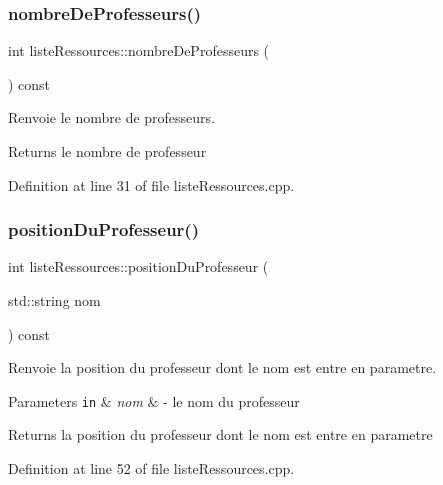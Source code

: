 \subsubsection{\texorpdfstring{nombre\+De\+Professeurs()}{nombreDeProfesseurs()}}
{\footnotesize\ttfamily int liste\+Ressources\+::nombre\+De\+Professeurs (\begin{DoxyParamCaption}{ }\end{DoxyParamCaption}) const}



Renvoie le nombre de professeurs. 

\begin{DoxyReturn}{Returns}
le nombre de professeur 
\end{DoxyReturn}


Definition at line 31 of file liste\+Ressources.\+cpp.

\hypertarget{classliste_ressources_a1ba16dd4280006301dc94d467b9dddaa}{}\label{classliste_ressources_a1ba16dd4280006301dc94d467b9dddaa} 
\subsubsection{\texorpdfstring{position\+Du\+Professeur()}{positionDuProfesseur()}}
{\footnotesize\ttfamily int liste\+Ressources\+::position\+Du\+Professeur (\begin{DoxyParamCaption}\item[{std\+::string}]{nom }\end{DoxyParamCaption}) const}



Renvoie la position du professeur dont le nom est entre en parametre. 


\begin{DoxyParams}[1]{Parameters}
\mbox{\tt in}  & {\em nom} & -\/ le nom du professeur \\
\hline
\end{DoxyParams}
\begin{DoxyReturn}{Returns}
la position du professeur dont le nom est entre en parametre 
\end{DoxyReturn}


Definition at line 52 of file liste\+Ressources.\+cpp.

\hypertarget{classliste_ressources_acd47bea2a7105b73adcf0891b82d2e1c}{}\label{classliste_ressources_acd47bea2a7105b73adcf0891b82d2e1c} 
